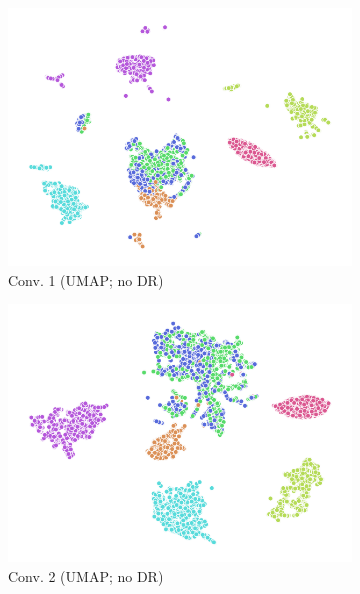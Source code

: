 \begin{figure}
  \begin{subfigure}{0.22\textwidth}
    \includegraphics[width=\textwidth]{figures/chapter6/embeddings/jaco_no-DR_prop_conv1_UMAP.png}
    \caption{Conv. 1 (UMAP; no DR)}
  \end{subfigure}
  \begin{subfigure}{0.22\textwidth}
    \includegraphics[width=\textwidth]{figures/chapter6/embeddings/jaco_no-DR_prop_conv2_UMAP.png}
    \caption{Conv. 2 (UMAP; no DR)}
  \end{subfigure}
  \begin{subfigure}{0.22\textwidth}

\end{subfigure}
\end{figure}
